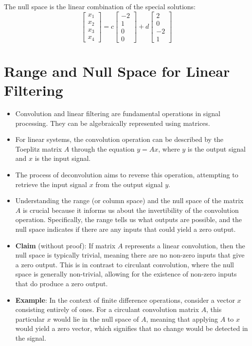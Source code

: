 The null space is the linear combination of the special solutions:
\[
\begin{bmatrix}
x_1 \\
x_2 \\
x_3 \\
x_4
\end{bmatrix} = c
\begin{bmatrix}
-2 \\
1 \\
0 \\
0
\end{bmatrix} + d
\begin{bmatrix}
2 \\
0 \\
-2 \\
1
\end{bmatrix}
\]

\section*{Range and Null Space for Linear Filtering}

\begin{itemize}
    \item Convolution and linear filtering are fundamental operations in signal processing. They can be algebraically represented using matrices.
    \item For linear systems, the convolution operation can be described by the Toeplitz matrix \( A \) through the equation \( y = Ax \), where \( y \) is the output signal and \( x \) is the input signal.
    \item The process of deconvolution aims to reverse this operation, attempting to retrieve the input signal \( x \) from the output signal \( y \).
    \item Understanding the range (or column space) and the null space of the matrix \( A \) is crucial because it informs us about the invertibility of the convolution operation. Specifically, the range tells us what outputs are possible, and the null space indicates if there are any inputs that could yield a zero output.
    \item \textbf{Claim} (without proof): If matrix \( A \) represents a linear convolution, then the null space is typically trivial, meaning there are no non-zero inputs that give a zero output. This is in contrast to circulant convolution, where the null space is generally non-trivial, allowing for the existence of non-zero inputs that do produce a zero output.
    \item \textbf{Example}: In the context of finite difference operations, consider a vector \( x \) consisting entirely of ones. For a circulant convolution matrix \( A \), this particular \( x \) would lie in the null space of \( A \), meaning that applying \( A \) to \( x \) would yield a zero vector, which signifies that no change would be detected in the signal.
\end{itemize}